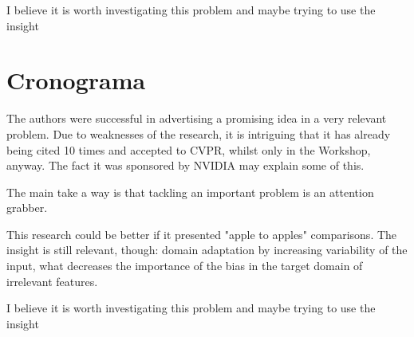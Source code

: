 \documentclass[
12pt, %
a4paper, %
onecolumn, %
]{article}
\begin{document}
I believe it is worth investigating this problem and maybe trying to use the insight


\section{Cronograma}

The authors were successful in advertising a promising idea in a very relevant problem.  Due to weaknesses of the research, it is intriguing that it has already being cited 10 times and accepted to CVPR, whilst only in the Workshop, anyway. The fact it was sponsored by NVIDIA may explain some of this.

The main take a way is that tackling an important problem is an attention grabber. 

This research could be better if it presented "apple to apples" comparisons. The insight is still relevant, though: domain adaptation by increasing variability of the input, what decreases the importance of the bias in the target domain of irrelevant features.

I believe it is worth investigating this problem and maybe trying to use the insight


%

\renewcommand{\refname}{Bibliografia} %


\end{document}
